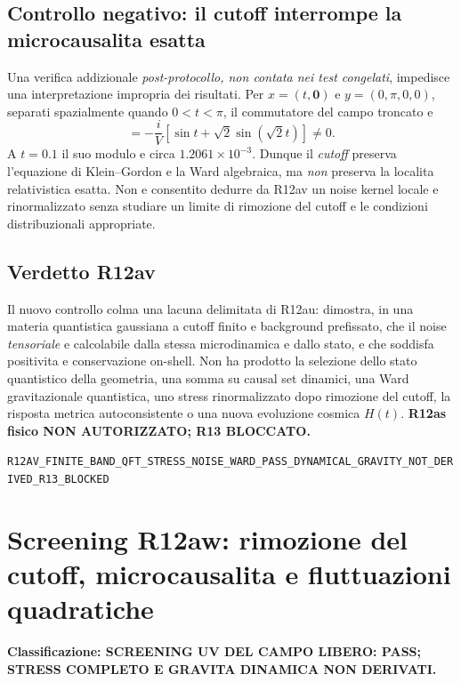 \documentclass[11pt,a4paper]{article}
\newcommand{\status}[1]{\textsf{#1}}
\begin{document}
\subsection{Controllo negativo: il cutoff interrompe la microcausalita esatta}
Una verifica addizionale \emph{post-protocollo, non contata nei test congelati}, impedisce una interpretazione impropria dei risultati. Per $x=(t,\mathbf0)$ e $y=(0,\pi,0,0)$, separati spazialmente quando $0<t<\pi$, il commutatore del campo troncato e
\begin{equation}
 [\hat\phi(x),\hat\phi(y)]
 =-\frac{i}{V}\left[\sin t+\sqrt2\sin(\sqrt2t)\right]\ne0.
 \label{eq:r12av-nonlocal-cutoff}
\end{equation}
A $t=0.1$ il suo modulo e circa $1.2061\times10^{-3}$. Dunque il \emph{cutoff} preserva l'equazione di Klein--Gordon e la Ward algebraica, ma \emph{non} preserva la localita relativistica esatta. Non e consentito dedurre da R12av un noise kernel locale e rinormalizzato senza studiare un limite di rimozione del cutoff e le condizioni distribuzionali appropriate.

\subsection{Verdetto R12av}
Il nuovo controllo colma una lacuna delimitata di R12au: dimostra, in una materia quantistica gaussiana a cutoff finito e background prefissato, che il noise \emph{tensoriale} e calcolabile dalla stessa microdinamica e dallo stato, e che soddisfa positivita e conservazione on-shell. Non ha prodotto la selezione dello stato quantistico della geometria, una somma su causal set dinamici, una Ward gravitazionale quantistica, uno stress rinormalizzato dopo rimozione del cutoff, la risposta metrica autoconsistente o una nuova evoluzione cosmica $H(t)$. \textbf{R12as fisico NON AUTORIZZATO; R13 BLOCCATO.}
\begin{center}\small
\nolinkurl{R12AV_FINITE_BAND_QFT_STRESS_NOISE_WARD_PASS_DYNAMICAL_GRAVITY_NOT_DERIVED_R13_BLOCKED}
\end{center}


\clearpage
\section{Screening R12aw: rimozione del cutoff, microcausalita e fluttuazioni quadratiche}
\label{sec:r12aw-uv}
\textbf{Classificazione: \status{SCREENING UV DEL CAMPO LIBERO: PASS; STRESS COMPLETO E GRAVITA DINAMICA NON DERIVATI}.}
\end{document}
